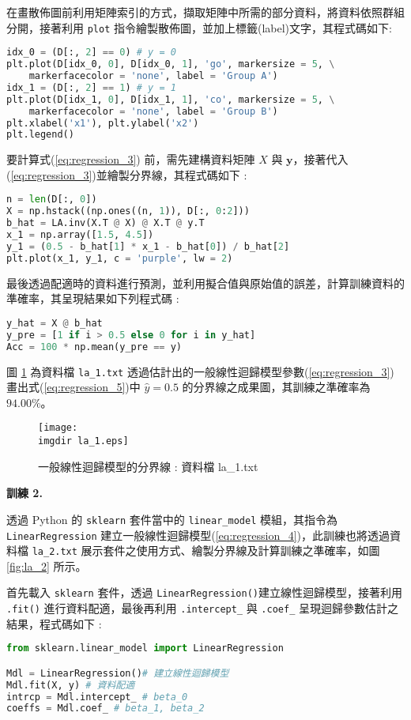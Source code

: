 在畫散佈圖前利用矩陣索引的方式，擷取矩陣中所需的部分資料，將資料依照群組分開，接著利用 \verb|plot| 指令繪製散佈圖，並加上標籤(label)文字，其程式碼如下:
\bigskip
\begin{lstlisting}[language = Python]
idx_0 = (D[:, 2] == 0) # y = 0
plt.plot(D[idx_0, 0], D[idx_0, 1], 'go', markersize = 5, \
	markerfacecolor = 'none', label = 'Group A')
idx_1 = (D[:, 2] == 1) # y = 1
plt.plot(D[idx_1, 0], D[idx_1, 1], 'co', markersize = 5, \
	markerfacecolor = 'none', label = 'Group B')
plt.xlabel('x1'), plt.ylabel('x2')
plt.legend()
\end{lstlisting}

要計算式(\ref{eq:regression_3}) 前，需先建構資料矩陣 $X$ 與 $\mathbf{y}$，接著代入(\ref{eq:regression_3})並繪製分界線，其程式碼如下 :
\bigskip
\begin{lstlisting}[language = Python]
n = len(D[:, 0])
X = np.hstack((np.ones((n, 1)), D[:, 0:2]))  
b_hat = LA.inv(X.T @ X) @ X.T @ y.T
x_1 = np.array([1.5, 4.5])
y_1 = (0.5 - b_hat[1] * x_1 - b_hat[0]) / b_hat[2]
plt.plot(x_1, y_1, c = 'purple', lw = 2)
\end{lstlisting}

最後透過配適時的資料進行預測，並利用擬合值與原始值的誤差，計算訓練資料的準確率，其呈現結果如下列程式碼 :
\bigskip
\begin{lstlisting}[language = Python]
y_hat = X @ b_hat
y_pre = [1 if i > 0.5 else 0 for i in y_hat]
Acc = 100 * np.mean(y_pre == y)
\end{lstlisting}

圖 \ref{fig:la_1} 為資料檔 \verb|la_1.txt| 透過估計出的一般線性迴歸模型參數(\ref{eq:regression_3})畫出式(\ref{eq:regression_5})中 $\hat{y} = 0.5$ 的分界線之成果圖，其訓練之準確率為 $94.00	\%$。
\begin{figure}[H]
    \centering
        \texttt{[image: \\imgdir la\_1.eps]}
    \caption{一般線性迴歸模型的分界線 : 資料檔 la\_1.txt}
    \label{fig:la_1}
\end{figure}

\textbf{\large 訓練 2.}

透過 Python 的 \verb|sklearn| 套件當中的 \verb|linear_model| 模組，其指令為 \verb|LinearRegression| 建立一般線性迴歸模型(\ref{eq:regression_4})，此訓練也將透過資料檔 \verb|la_2.txt| 展示套件之使用方式、繪製分界線及計算訓練之準確率，如圖 \ref{fig:la_2} 所示。

首先載入 \verb|sklearn| 套件，透過 \verb|LinearRegression()|建立線性迴歸模型，接著利用 \verb|.fit()| 進行資料配適，最後再利用 \verb|.intercept_| 與 \verb|.coef_| 呈現迴歸參數估計之結果，程式碼如下 :
\bigskip
\begin{lstlisting}[language = Python]
from sklearn.linear_model import LinearRegression

Mdl = LinearRegression()# 建立線性迴歸模型
Mdl.fit(X, y) # 資料配適
intrcp = Mdl.intercept_ # beta_0
coeffs = Mdl.coef_ # beta_1, beta_2
\end{lstlisting}

